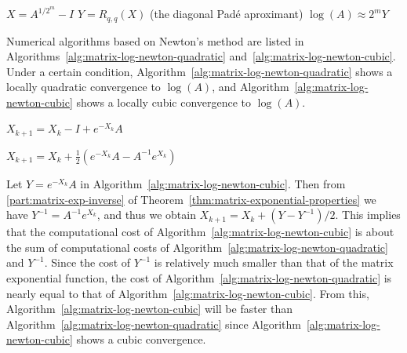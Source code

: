 \begin{algorithm}[H]\caption{{Computation of $\log(A)$}}\label{alg:matrix-log-pade}\begin{algorithmic}[1]
\State $X=A^{1/2^m}-I$
\State $Y=R_{q,q}(X)$ ({the diagonal Padé aproximant})
\State $\log(A)\approx2^mY$
\end{algorithmic}\end{algorithm}

{Numerical algorithms based on Newton's method are listed in Algorithms~\ref{alg:matrix-log-newton-quadratic} and~\ref{alg:matrix-log-newton-cubic}. Under a certain condition, Algorithm~\ref{alg:matrix-log-newton-quadratic} shows a locally quadratic convergence to $\log(A)$, and Algorithm~\ref{alg:matrix-log-newton-cubic} shows a locally cubic convergence to $\log(A)$.}

\begin{algorithm}[H]\caption{{Iterative method 1 for $X=\log(A)$}}\label{alg:matrix-log-newton-quadratic}\begin{algorithmic}[1]
\State $X_{k+1}=X_k-I+e^{-X_k}A$
\EndFor
\end{algorithmic}\end{algorithm}

\begin{algorithm}[H]\caption{{Iterative method 2 for $X=\log(A)$}}\label{alg:matrix-log-newton-cubic}\begin{algorithmic}[1]
\State $X_{k+1}=X_k+\frac{1}{2}(e^{-X_k}A-A^{-1}e^{X_k})$
\EndFor
\end{algorithmic}\end{algorithm}

{Let $Y=e^{-X_k}A$ in Algorithm~\ref{alg:matrix-log-newton-cubic}. Then from \ref{part:matrix-exp-inverse} of Theorem~\ref{thm:matrix-exponential-properties} we have $Y^{-1}=A^{-1}e^{X_k}$, and thus we obtain $X_{k+1}=X_k+(Y-Y^{-1})/2$. This implies that the computational cost of Algorithm~\ref{alg:matrix-log-newton-cubic} is about the sum of computational costs of Algorithm~\ref{alg:matrix-log-newton-quadratic} and $Y^{-1}$. Since the cost of $Y^{-1}$ is relatively much smaller than that of the matrix exponential function, the cost of Algorithm~\ref{alg:matrix-log-newton-quadratic} is nearly equal to that of Algorithm~\ref{alg:matrix-log-newton-cubic}. From this, Algorithm~\ref{alg:matrix-log-newton-cubic} will be faster than Algorithm~\ref{alg:matrix-log-newton-quadratic} since Algorithm~\ref{alg:matrix-log-newton-cubic} shows a cubic convergence.}

